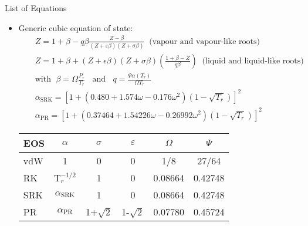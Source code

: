 \documentclass[calculator,allquestions,datasheet]{exam_newMarcus2}
\newcommand{\frc}{\displaystyle\frac}
\begin{document}
\vfill
\paperend








\clearpage

\begin{center}
\Large{List of Equations}
\end{center}

\begin{itemize}
\item Generic cubic equation of state:
\begin{eqnarray}
&& Z= 1 + \beta - q\beta \frc{Z - \beta} {\left(Z+\varepsilon\beta\right)\left(Z+\sigma\beta\right)}  \;\;\text{(vapour and vapour-like roots)}\nonumber\\
&& Z= 1 + \beta + \left(Z + \epsilon\beta\right)\left(Z+\sigma\beta\right)\left(\frc{1+\beta-Z}{q\beta}\right)  \;\;\text{(liquid and liquid-like roots)}\nonumber\\
&& \text{with }\; \beta=\Omega\frc{P_{r}}{T_{r}} \;\;\text{ and } \;\; q=\frc{\Psi\alpha\left(T_{r}\right)}{\Omega T_{r}}  \nonumber \\
&&\alpha_{\text{SRK}} = \left[ 1 + \left( 0.480 + 1.574 \omega - 0.176\omega^{2}\right)\left(1-\sqrt{T_{r}}\right)\right]^{2}  \nonumber \\
&&\alpha_{\text{PR}} = \left[ 1 + \left( 0.37464 + 1.54226 \omega - 0.26992\omega^{2}\right)\left(1-\sqrt{T_{r}}\right)\right]^{2} \nonumber
\end{eqnarray} 
    \begin{center}
       \begin{tabular}{| l | c c c c c| }
       \hline
          {\bf EOS}  & {\bf $\alpha$} & {\bf $\sigma$}  & {\bf $\varepsilon$} & {\bf $\Omega$} & {\bf $\Psi$ } \\
       \hline
            vdW      & 1              & 0               & 0                  & 1/8            & 27/64          \\
            RK       & T$_{r}^{-1/2}$  & 1                & 0                  & 0.08664       & 0.42748        \\
           SRK       &$\alpha_{\text{SRK}}$& 1            & 0                   & 0.08664       & 0.42748        \\
            PR       &$\alpha_{\text{PR}}$& 1+$\sqrt{2}$   & 1-$\sqrt{2}$        & 0.07780        & 0.45724  \\
       \hline
       \end{tabular}
    \end{center}


\end{itemize}
\end{document}
